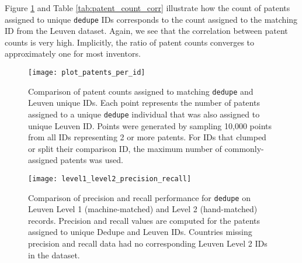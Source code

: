 \documentclass[11pt]{article}
\begin{document}
Figure \ref{fig:id-patent-counts} and Table \ref{tab:patent_count_corr}
illustrate how the count of patents assigned to unique \texttt{dedupe}
IDs corresponds to the count assigned to the matching ID from the
Leuven dataset. Again, we see that the correlation between patent
counts is very high. Implicitly, the ratio of patent counts converges
to approximately one for most inventors. 

\begin{figure}[ht]
  \centering
  \texttt{[image: plot\_patents\_per\_id]}
  \caption{Comparison of patent counts assigned to matching
    \texttt{dedupe} and Leuven unique IDs. Each point represents the
    number of patents assigned to a unique \texttt{dedupe} individual
    that was also assigned to unique Leuven ID. Points were generated
    by sampling 10,000 points from all IDs representing 2 or more
    patents. For IDs that clumped
    or split their comparison ID, the maximum number of
    commonly-assigned patents was used.}
  \label{fig:id-patent-counts}
\end{figure}





\begin{figure}[ht]
  \centering
  \texttt{[image: level1\_level2\_precision\_recall]}
  \caption{Comparison of precision and recall performance for
    \texttt{dedupe} on Leuven Level 1 (machine-matched) and Level 2
    (hand-matched) records. Precision and recall values are computed
    for the patents assigned to unique Dedupe and Leuven
    IDs. Countries missing precision and recall data had no
    corresponding Leuven Level 2 IDs in the dataset.}
  \label{fig:l1-l2-pr}
\end{figure}

\end{document}
